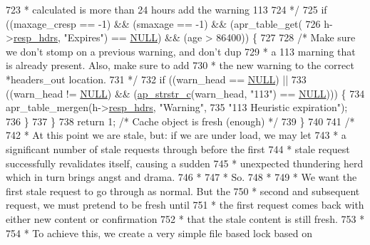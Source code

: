 \begin{DoxyCode}
{{723 \textcolor{comment}{         * calculated is more than 24 hours add the warning 113}
724 \textcolor{comment}{         */}
725         \textcolor{keywordflow}{if} ((maxage\_cresp == -1) && (smaxage == -1) && (apr\_table\_get(
726                 h->\hyperlink{structcache__handle_a66c4c1875bb9740d34ddda4d3e71065e}{resp\_hdrs}, \textcolor{stringliteral}{"Expires"}) == \hyperlink{pcre_8txt_ad7f989d16aa8ca809a36bc392c07fba1}{NULL}) && (age > 86400)) \{
727 
728             \textcolor{comment}{/* Make sure we don't stomp on a previous warning, and don't dup}
729 \textcolor{comment}{             * a 113 marning that is already present. Also, make sure to add}
730 \textcolor{comment}{             * the new warning to the correct *headers\_out location.}
731 \textcolor{comment}{             */}
732             \textcolor{keywordflow}{if} ((warn\_head == \hyperlink{pcre_8txt_ad7f989d16aa8ca809a36bc392c07fba1}{NULL}) ||
733                 ((warn\_head != \hyperlink{pcre_8txt_ad7f989d16aa8ca809a36bc392c07fba1}{NULL}) && (\hyperlink{group__APACHE__CORE__DAEMON_ga48f6ba4ea178ad3a334403ec7206d7a3}{ap\_strstr\_c}(warn\_head, \textcolor{stringliteral}{"113"}) == 
      \hyperlink{pcre_8txt_ad7f989d16aa8ca809a36bc392c07fba1}{NULL}))) \{
734                 apr\_table\_mergen(h->\hyperlink{structcache__handle_a66c4c1875bb9740d34ddda4d3e71065e}{resp\_hdrs}, \textcolor{stringliteral}{"Warning"},
735                                  \textcolor{stringliteral}{"113 Heuristic expiration"});
736             \}
737         \}
738         \textcolor{keywordflow}{return} 1;    \textcolor{comment}{/* Cache object is fresh (enough) */}
739     \}
740 
741     \textcolor{comment}{/*}
742 \textcolor{comment}{     * At this point we are stale, but: if we are under load, we may let}
743 \textcolor{comment}{     * a significant number of stale requests through before the first}
744 \textcolor{comment}{     * stale request successfully revalidates itself, causing a sudden}
745 \textcolor{comment}{     * unexpected thundering herd which in turn brings angst and drama.}
746 \textcolor{comment}{     *}
747 \textcolor{comment}{     * So.}
748 \textcolor{comment}{     *}
749 \textcolor{comment}{     * We want the first stale request to go through as normal. But the}
750 \textcolor{comment}{     * second and subsequent request, we must pretend to be fresh until}
751 \textcolor{comment}{     * the first request comes back with either new content or confirmation}
752 \textcolor{comment}{     * that the stale content is still fresh.}
753 \textcolor{comment}{     *}
754 \textcolor{comment}{     * To achieve this, we create a very simple file based lock based on}
}}
\end{DoxyCode}
